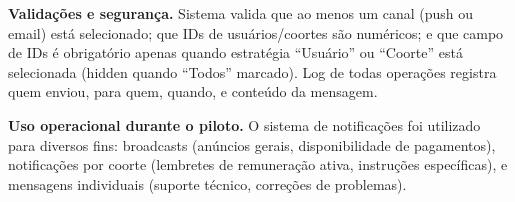 \textbf{Validações e segurança.} Sistema valida que ao menos um canal (push ou email) está selecionado; que IDs de usuários/coortes são numéricos; e que campo de IDs é obrigatório apenas quando estratégia ``Usuário'' ou ``Coorte'' está selecionada (hidden quando ``Todos'' marcado). Log de todas operações registra quem enviou, para quem, quando, e conteúdo da mensagem.

\textbf{Uso operacional durante o piloto.} O sistema de notificações foi utilizado para diversos fins: broadcasts (anúncios gerais, disponibilidade de pagamentos), notificações por coorte (lembretes de remuneração ativa, instruções específicas), e mensagens individuais (suporte técnico, correções de problemas).


